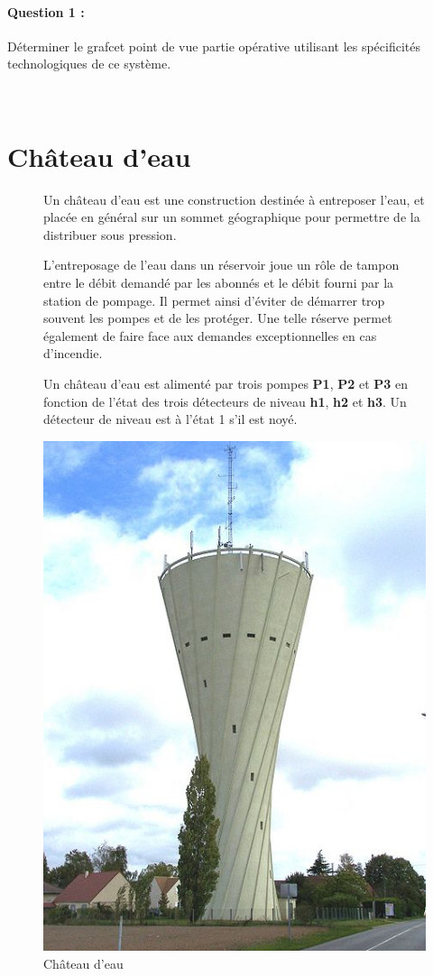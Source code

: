 \paragraph{Question 1 :} Déterminer le grafcet point de vue partie opérative utilisant les spécificités technologiques de ce système.

\newpage

~\

\newpage

\section{Château d'eau}

\begin{figure}[!h]
\begin{minipage}{0.55\linewidth}
Un château d'eau est une construction destinée à entreposer l'eau, et placée en général sur un sommet géographique pour permettre de la distribuer sous pression.

L'entreposage de l'eau dans un réservoir joue un rôle de tampon entre le débit demandé par les abonnés et le débit fourni par la station de pompage. Il permet ainsi d'éviter de démarrer trop souvent les pompes et de les protéger. Une telle réserve permet également de faire face aux demandes exceptionnelles en cas d'incendie.

Un château d'eau est alimenté par trois pompes \textbf{P1}, \textbf{P2} et \textbf{P3} en fonction de l'état des trois détecteurs de niveau \textbf{h1}, \textbf{h2} et \textbf{h3}. Un détecteur de niveau est à l'état 1 s'il est noyé.
\end{minipage}
\hfill
\begin{minipage}{0.4\linewidth}
 \begin{center}
 \includegraphics[width=0.7\linewidth]{img/chateau-eau.jpg}
 \end{center}
 \caption{Château d'eau}
 \label{img3}
 \end{minipage}
\end{figure}

